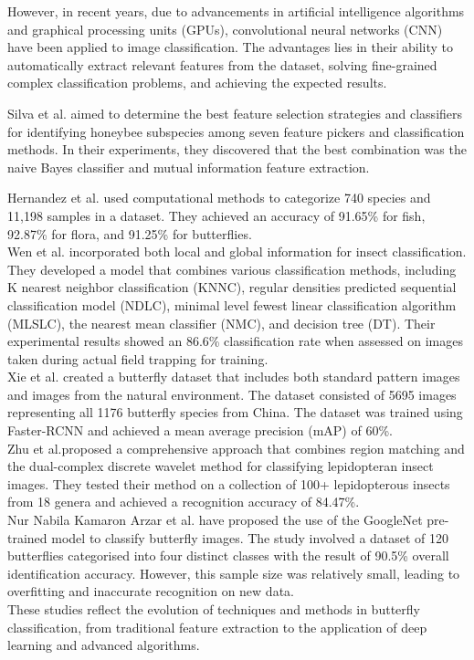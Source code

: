 \documentclass[10pt,twocolumn,letterpaper]{article}
\begin{document}
\indent However, in recent years, due to advancements in artificial intelligence algorithms and graphical processing units (GPUs), convolutional neural networks (CNN) have been applied to image classification. The advantages lies in their ability to automatically extract relevant features from the dataset, solving fine-grained complex classification problems, and achieving the expected results. 

Silva et al.\cite{rashid2020sustainable} 
aimed to determine the best feature selection strategies and classifiers for identifying honeybee subspecies among seven feature pickers and classification methods. In their experiments, they discovered that the best combination was the naive Bayes classifier and mutual information feature extraction.

Hernandez et al.\cite{hernandez2014automatic} 
used computational methods to categorize 740 species and 11,198 samples in a dataset. They achieved an accuracy of 91.65\% for fish, 92.87\% for flora, and 91.25\% for butterflies.
\\
\indent 
Wen et al.\cite{hernandez2014automatic} 
incorporated both local and global information for insect classification. They developed a model that combines various classification methods, including K nearest neighbor classification (KNNC), regular densities predicted sequential classification model (NDLC), minimal level fewest linear classification algorithm (MLSLC), the nearest mean classifier (NMC), and decision tree (DT). Their experimental results showed an 86.6\% classification rate when assessed on images taken during actual field trapping for training.\\
\indent 
Xie et al.\cite{xie2018automatic} 
created a butterfly dataset that includes both standard pattern images and images from the natural environment. The dataset consisted of 5695 images representing all 1176 butterfly species from China. The dataset was trained using Faster-RCNN and achieved a mean average precision (mAP) of 60\%.\\
\indent 
Zhu et al.\cite{zhu2019towards}proposed a comprehensive approach that combines region matching and the dual-complex discrete wavelet method for classifying lepidopteran insect images. They tested their method on a collection of 100+ lepidopterous insects from 18 genera and achieved a recognition accuracy of 84.47\%.\\
\indent 
Nur Nabila Kamaron Arzar et al.\cite{arzar2019butterfly} have proposed the use of the GoogleNet pre-trained model to classify butterfly images. The study involved a dataset of 120 butterflies categorised into four distinct classes with the result of 90.5\% overall identification accuracy. However, this sample size was relatively small, leading to overfitting and inaccurate recognition on new data.\\
\indent 
These studies reflect the evolution of techniques and methods in butterfly classification, from traditional feature extraction to the application of deep learning and advanced algorithms.
\end{document}

